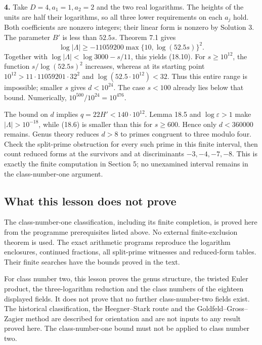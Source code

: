 \documentclass[
  11pt,
  a4paper,
]{article}
\begin{document}
\textbf{4.} Take \(D=4,a_1=1,a_2=2\) and the two real logarithms. The
heights of the units are half their logarithms, so all three lower
requirements on each \(a_j\) hold. Both coefficients are nonzero
integers; their linear form is nonzero by Solution 3. The parameter
\(B'\) is less than \(52.5s\). Theorem 7.1 gives \[
 \log|\Lambda|\ge-11059200\max\{10,\log(52.5s)\}^2.
\] Together with \(\log|\Lambda|<\log3000-s/11\), this yields (18.10).
For \(s\ge10^{12}\), the function \(s/\log(52.5s)^2\) increases, whereas
at its starting point \(10^{12}>11\cdot11059201\cdot32^2\) and
\(\log(52.5\cdot10^{12})<32\). Thus this entire range is impossible;
smaller \(s\) gives \(d<10^{24}\). The case \(s<100\) already lies below
that bound. Numerically, \(10^{500}/10^{24}=10^{476}\).

The bound on \(d\) implies \(q=22H'<140\cdot10^{12}\). Lemma 18.5 and
\(\log\varepsilon>1\) make \(|\Lambda|>10^{-18}\), while (18.6) is
smaller than this for \(s\ge600\). Hence only \(d<360000\) remains.
Genus theory reduces \(d>8\) to primes congruent to three modulo four.
Check the split-prime obstruction for every such prime in this finite
interval, then count reduced forms at the survivors and at discriminants
\(-3,-4,-7,-8\). This is exactly the finite computation in Section 5; no
unexamined interval remains in the class-number-one argument.

\subsection{What this lesson does not
prove}\label{what-this-lesson-does-not-prove}

The class-number-one classification, including its finite completion, is
proved here from the programme prerequisites listed above. No external
finite-exclusion theorem is used. The exact arithmetic programs
reproduce the logarithm enclosures, continued fractions, all split-prime
witnesses and reduced-form tables. Their finite searches have the bounds
proved in the text.

For class number two, this lesson proves the genus structure, the
twisted Euler product, the three-logarithm reduction and the class
numbers of the eighteen displayed fields. It does not prove that no
further class-number-two fields exist. The historical classification,
the Heegner--Stark route and the Goldfeld--Gross--Zagier method are
described for orientation and are not inputs to any result proved here.
The class-number-one bound must not be applied to class number two.
\end{document}
